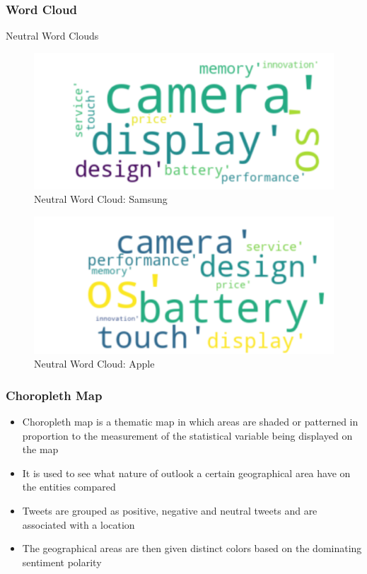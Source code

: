 \documentclass{beamer}
\begin{document}
\begin{frame}
\frametitle{Word Cloud}
{\large Neutral Word Clouds}
\begin{figure}
\includegraphics[scale=0.5]{samneu}
\caption{Neutral Word Cloud: Samsung}
\end{figure}
\begin{figure}
\includegraphics[scale=0.5]{aplneu}
\caption{Neutral Word Cloud: Apple}
\end{figure}
\end{frame}

\begin{frame}
\frametitle{Choropleth Map}
\begin{itemize}
\item Choropleth map is a thematic map in which areas are shaded or patterned in proportion to the measurement of the statistical variable being displayed on the map
\item It is used to see what nature of outlook a certain geographical area have on the entities compared
\item Tweets are grouped as positive, negative and neutral tweets and are associated with a location
\item The geographical areas are then given distinct colors based on the dominating sentiment polarity
\end{itemize}
\end{frame}
\end{document}
